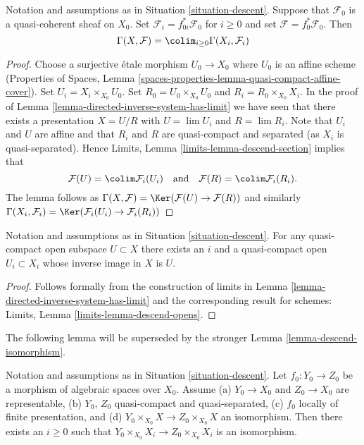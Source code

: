 \begin{lemma}
\label{lemma-descend-section}
Notation and assumptions as in Situation \ref{situation-descent}.
Suppose that $\mathcal{F}_0$ is a quasi-coherent sheaf on $X_0$.
Set $\mathcal{F}_i = f_{0i}^*\mathcal{F}_0$ for $i \geq 0$ and set
$\mathcal{F} = f_0^*\mathcal{F}_0$. Then
$$
\Gamma(X, \mathcal{F}) = \colim_{i \geq 0} \Gamma(X_i, \mathcal{F}_i)
$$
\end{lemma}

\begin{proof}
Choose a surjective \'etale morphism $U_0 \to X_0$ where $U_0$ is an affine
scheme (Properties of Spaces, Lemma
\ref{spaces-properties-lemma-quasi-compact-affine-cover}).
Set $U_i = X_i \times_{X_0} U_0$.
Set $R_0 = U_0 \times_{X_0} U_0$ and $R_i = R_0 \times_{X_0} X_i$.
In the proof of Lemma \ref{lemma-directed-inverse-system-has-limit} we have
seen that there exists a presentation $X = U/R$ with
$U = \lim U_i$ and $R = \lim R_i$.
Note that $U_i$ and $U$ are affine and that $R_i$ and $R$ are
quasi-compact and separated (as $X_i$ is quasi-separated). Hence
Limits, Lemma \ref{limits-lemma-descend-section}
implies that
$$
\mathcal{F}(U) = \colim \mathcal{F}_i(U_i)
\quad\text{and}\quad
\mathcal{F}(R) = \colim \mathcal{F}_i(R_i).
$$
The lemma follows as
$\Gamma(X, \mathcal{F}) = \Ker(\mathcal{F}(U) \to \mathcal{F}(R))$
and similarly
$\Gamma(X_i, \mathcal{F}_i) =
\Ker(\mathcal{F}_i(U_i) \to \mathcal{F}_i(R_i))$
\end{proof}

\begin{lemma}
\label{lemma-descend-opens}
Notation and assumptions as in Situation \ref{situation-descent}.
For any quasi-compact open subspace $U \subset X$ there exists an $i$
and a quasi-compact open $U_i \subset X_i$ whose inverse image in $X$ is $U$.
\end{lemma}

\begin{proof}
Follows formally from the construction of limits in
Lemma \ref{lemma-directed-inverse-system-has-limit}
and the corresponding result for schemes:
Limits, Lemma \ref{limits-lemma-descend-opens}.
\end{proof}

\noindent
The following lemma will be superseded by the stronger
Lemma \ref{lemma-descend-isomorphism}.

\begin{lemma}
\label{lemma-descend-equality}
Notation and assumptions as in Situation \ref{situation-descent}.
Let $f_0 : Y_0 \to Z_0$ be a morphism of algebraic spaces over $X_0$.
Assume (a) $Y_0 \to X_0$ and $Z_0 \to X_0$ are representable, (b)
$Y_0$, $Z_0$ quasi-compact and quasi-separated, (c)
$f_0$ locally of finite presentation, and
(d) $Y_0 \times_{X_0} X \to Z_0 \times_{X_0} X$ an isomorphism.
Then there exists an $i \geq 0$ such that
$Y_0 \times_{X_0} X_i \to Z_0 \times_{X_0} X_i$ is an isomorphism.
\end{lemma}

